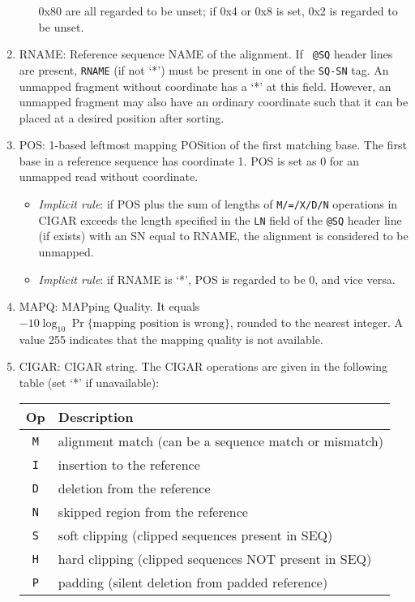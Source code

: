 \documentclass[10pt]{article}
\begin{document}
\begin{enumerate}
\begin{itemize}
    0x80 are all regarded to be unset; if 0x4 or 0x8 is set, 0x2 is
    regarded to be unset.
  \end{itemize}
\item {\sf RNAME}: Reference sequence NAME of the alignment. If {\tt
    @SQ} header lines are present, {\tt RNAME} (if not `*') must be
  present in one of the {\tt SQ-SN} tag. An unmapped fragment without
  coordinate has a `*' at this field. However, an unmapped fragment may
  also have an ordinary coordinate such that it can be placed at a
  desired position after sorting.
\item {\sf POS}: 1-based leftmost mapping POSition of the first matching
  base. The first base in a reference sequence has coordinate 1. {\sf
    POS} is set as 0 for an unmapped read without
  coordinate.
  \begin{itemize}
  \item \emph{Implicit rule}: if {\sf POS} plus the sum of lengths of
    {\tt M/=/X/D/N} operations in {\sf CIGAR} exceeds the length
    specified in the {\tt LN} field of the {\tt @SQ} header line (if
    exists) with an SN equal to {\sf RNAME}, the alignment is considered
    to be unmapped.
  \item \emph{Implicit rule}: if {\sf RNAME} is `*', {\sf POS} is
    regarded to be 0, and vice versa.
  \end{itemize}
\item {\sf MAPQ}: MAPping Quality. It equals
  $-10\log_{10}\Pr\{\mbox{mapping position is wrong}\}$, rounded to the
  nearest integer. A value 255 indicates that the mapping quality is not
  available.
\item {\sf CIGAR}: CIGAR string. The CIGAR operations are given in the
  following table (set `*' if unavailable):
  \begin{center}\small
  \begin{tabular}{cl}
  \hline
  Op & Description\\
  \hline
  {\tt M} & alignment match (can be a sequence match or mismatch)\\
  {\tt I} & insertion to the reference \\
  {\tt D} & deletion from the reference \\
  {\tt N} & skipped region from the reference \\
  {\tt S} & soft clipping (clipped sequences present in {\sf SEQ})\\
  {\tt H} & hard clipping (clipped sequences NOT present in {\sf SEQ})\\
  {\tt P} & padding (silent deletion from padded reference)\\

\end{tabular}
\end{center}
\end{enumerate}
\end{document}
